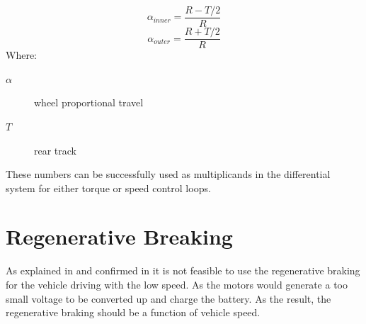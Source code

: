 \begin{equation}\label{diff_eq}
    \alpha_{inner} = \frac{R - T/2}{R}
\end{equation}
\begin{equation}
    \alpha_{outer} = \frac{R + T/2}{R} 
\end{equation}
Where:
\begin{description}
    \item[$\alpha$] wheel proportional travel
    \item[$T$] rear track
\end{description}




These numbers can be successfully used as multiplicands in the differential system for either torque or speed control loops.

\section{Regenerative Breaking} \label{regenerative_theory_section}

As explained in \cite{low_speed_regenerative_breaking} and confirmed in \cite{regen_strategy} it is not feasible to use the regenerative braking for the vehicle driving with the low speed. As the motors would generate a too small voltage to be converted up and charge the battery.
As the result, the regenerative braking should be a function of vehicle speed.

